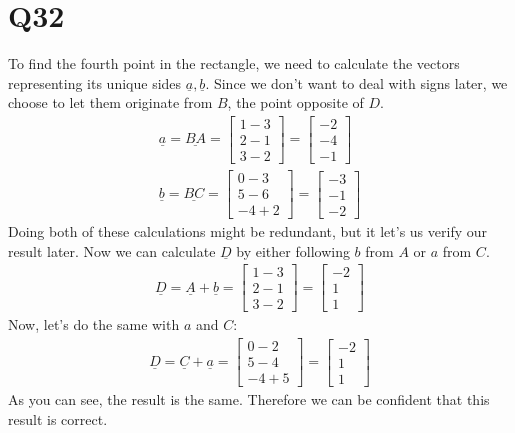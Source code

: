 \documentclass{article}
\renewcommand{\vec}{\underline}
\begin{document}
\section*{Q32}
To find the fourth point in the rectangle, we need to calculate the vectors representing its unique sides $\vec a, \vec b$. Since we don't want to deal with signs later, we choose to let them originate from $B$, the point opposite of $D$.
\begin{align}
   \vec a = \vec{BA} = 
   \begin{bmatrix}
        1 - 3\\
        2 - 1\\
        3 - 2
   \end{bmatrix} =
   \begin{bmatrix}
       -2\\
       -4\\
       -1
   \end{bmatrix}\\
   \vec b = \vec{BC} =
   \begin{bmatrix}
        0 - 3\\
        5 - 6\\
        -4 + 2    
   \end{bmatrix} =
   \begin{bmatrix}
       -3\\
       -1\\
       -2
   \end{bmatrix}
\end{align}
Doing both of these calculations might be redundant, but it let's us verify our result later. Now we can calculate $\vec D$ by either following $b$ from $A$ or $a$ from $C$.
\begin{align}
    \vec D = \vec A + \vec b =
    \begin{bmatrix}
        1 - 3\\
        2 - 1\\
        3 - 2
    \end{bmatrix} =
    \begin{bmatrix}
        -2\\
        1\\
        1
    \end{bmatrix}
\end{align}
Now, let's do the same with $a$ and $C$:
\begin{align}
    \vec D = \vec C + \vec a =
    \begin{bmatrix}
        0 - 2\\
        5 - 4\\
        -4 + 5
    \end{bmatrix} =
    \begin{bmatrix}
        -2\\
        1\\
        1
    \end{bmatrix}
\end{align}
As you can see, the result is the same. Therefore we can be confident that this result is correct.
\end{document}
